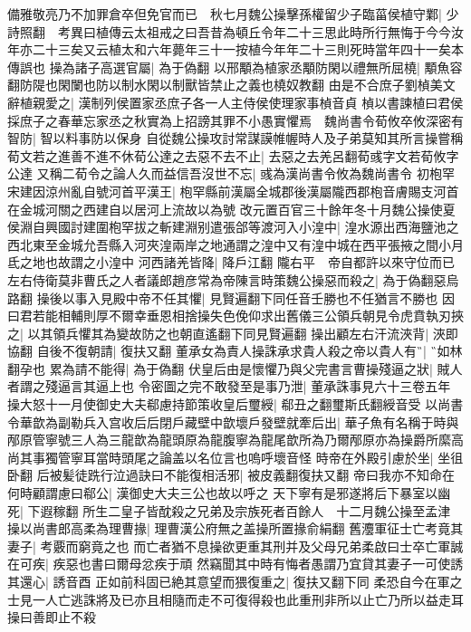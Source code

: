 備雅敬亮乃不加罪倉卒但免官而已　秋七月魏公操擊孫權留少子臨菑侯植守鄴|{
	少詩照翻　考異曰植傳云太祖戒之曰吾昔為頓丘令年二十三思此時所行無悔于今今汝年亦二十三矣又云植太和六年薨年三十一按植今年年二十三則死時當年四十一矣本傳誤也}
操為諸子高選官屬|{
	為于偽翻}
以邢顒為植家丞顒防閑以禮無所屈橈|{
	顒魚容翻防隄也閑闌也防以制水閑以制獸皆禁止之義也橈奴教翻}
由是不合庶子劉楨美文辭植親愛之|{
	漢制列侯置家丞庶子各一人主侍侯使理家事楨音貞}
楨以書諫植曰君侯採庶子之春華忘家丞之秋實為上招謗其罪不小愚實懼焉　魏尚書令荀攸卒攸深密有智防|{
	智以料事防以保身}
自從魏公操攻討常謀謨帷幄時人及子弟莫知其所言操嘗稱荀文若之進善不進不休荀公達之去惡不去不止|{
	去惡之去羌呂翻荀彧字文若荀攸字公達}
又稱二荀令之論人久而益信吾沒世不忘|{
	彧為漢尚書令攸為魏尚書令}
初枹罕宋建因涼州亂自號河首平漢王|{
	枹罕縣前漢屬全城郡後漢屬隴西郡枹音膚賜支河首在金城河關之西建自以居河上流故以為號}
改元置百官三十餘年冬十月魏公操使夏侯淵自興國討建圍枹罕拔之斬建淵别遣張郃等渡河入小湟中|{
	湟水源出西海鹽池之西北東至金城允吾縣入河夾湟兩岸之地通謂之湟中又有湟中城在西平張掖之間小月氐之地也故謂之小湟中}
河西諸羌皆降|{
	降戶江翻}
隴右平　帝自都許以來守位而已左右侍衛莫非曹氏之人者議郎趙彦常為帝陳言時策魏公操惡而殺之|{
	為于偽翻惡烏路翻}
操後以事入見殿中帝不任其懼|{
	見賢遍翻下同任音壬勝也不任猶言不勝也}
因曰君若能相輔則厚不爾幸垂恩相捨操失色俛仰求出舊儀三公領兵朝見令虎賁執刃挾之|{
	以其領兵懼其為變故防之也朝直遙翻下同見賢遍翻}
操出顧左右汗流浹背|{
	浹即協翻}
自後不復朝請|{
	復扶又翻}
董承女為責人操誅承求貴人殺之帝以貴人有|{
	如林翻孕也}
累為請不能得|{
	為于偽翻}
伏皇后由是懷懼乃與父完書言曹操殘逼之狀|{
	賊人者謂之殘逼言其逼上也}
令密圖之完不敢發至是事乃泄|{
	董承誅事見六十三卷五年}
操大怒十一月使御史大夫郗慮持節策收皇后璽綬|{
	郗丑之翻璽斯氏翻綬音受}
以尚書令華歆為副勒兵入宫收后后閉戶藏壁中歆壞戶發壁就牽后出|{
	華子魚有名稱于時與邴原管寧號三人為三龍歆為龍頭原為龍腹寧為龍尾歆所為乃爾邴原亦為操爵所縻高尚其事獨管寧耳當時頭尾之論盖以名位言也嗚呼壞音怪}
時帝在外殿引慮於坐|{
	坐徂卧翻}
后被髪徒跣行泣過訣曰不能復相活邪|{
	被皮義翻復扶又翻}
帝曰我亦不知命在何時顧謂慮曰郗公|{
	漢御史大夫三公也故以呼之}
天下寧有是邪遂將后下暴室以幽死|{
	下遐稼翻}
所生二皇子皆酖殺之兄弟及宗族死者百餘人　十二月魏公操至孟津　操以尚書郎高柔為理曹掾|{
	理曹漢公府無之盖操所置掾俞絹翻}
舊灋軍征士亡考竟其妻子|{
	考覈而窮竟之也}
而亡者猶不息操欲更重其刑并及父母兄弟柔啟曰士卒亡軍誠在可疾|{
	疾惡也書曰爾母忿疾于頑}
然竊聞其中時有悔者愚謂乃宜貸其妻子一可使誘其還心|{
	誘音酉}
正如前科固已絶其意望而猥復重之|{
	復扶又翻下同}
柔恐自今在軍之士見一人亡逃誅將及已亦且相隨而走不可復得殺也此重刑非所以止亡乃所以益走耳操曰善即止不殺

